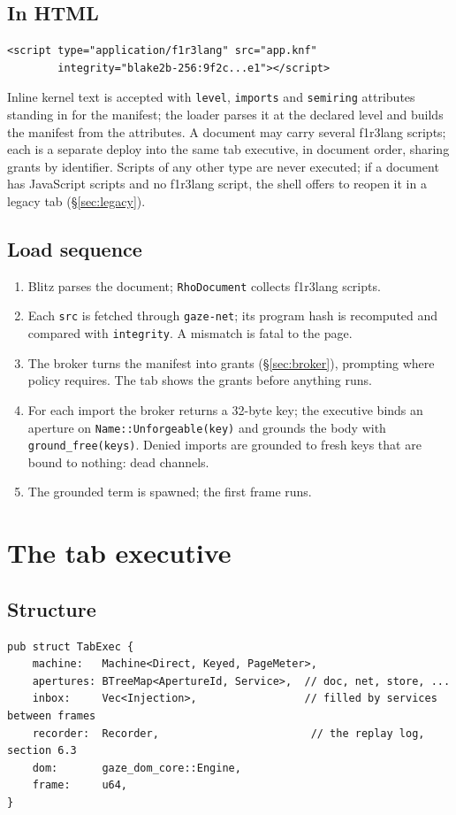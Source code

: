 \documentclass[11pt]{article}
\theoremstyle{definition}
\theoremstyle{remark}
\newcommand{\fl}{f1r3lang}
\newcommand{\code}[1]{\texttt{#1}}
\begin{document}
\subsection{In HTML}
\begin{lstlisting}
<script type="application/f1r3lang" src="app.knf"
        integrity="blake2b-256:9f2c...e1"></script>
\end{lstlisting}
Inline kernel text is accepted with \code{level}, \code{imports} and
\code{semiring} attributes standing in for the manifest; the loader parses it at the
declared level and builds the manifest from the attributes. A document may carry
several \fl{} scripts; each is a separate deploy into the same tab executive, in
document order, sharing grants by identifier. Scripts of any other type are never
executed; if a document has JavaScript scripts and no \fl{} script, the shell offers
to reopen it in a legacy tab (\S\ref{sec:legacy}).

\subsection{Load sequence}
\begin{enumerate}[nosep]
\item Blitz parses the document; \code{RhoDocument} collects \fl{} scripts.
\item Each \code{src} is fetched through \code{gaze-net}; its program hash is
  recomputed and compared with \code{integrity}. A mismatch is fatal to the page.
\item The broker turns the manifest into grants (\S\ref{sec:broker}), prompting where
  policy requires. The tab shows the grants before anything runs.
\item For each import the broker returns a 32-byte key; the executive binds an
  aperture on \code{Name::Unforgeable(key)} and grounds the body with
  \code{ground\_free(keys)}. Denied imports are grounded to fresh keys that are
  bound to nothing: dead channels.
\item The grounded term is spawned; the first frame runs.
\end{enumerate}

\section{The tab executive}\label{sec:tabexec}

\subsection{Structure}
\begin{lstlisting}[language=RustLite]
pub struct TabExec {
    machine:   Machine<Direct, Keyed, PageMeter>,
    apertures: BTreeMap<ApertureId, Service>,  // doc, net, store, ...
    inbox:     Vec<Injection>,                 // filled by services between frames
    recorder:  Recorder,                        // the replay log, section 6.3
    dom:       gaze_dom_core::Engine,
    frame:     u64,
}
\end{lstlisting}
\end{document}
